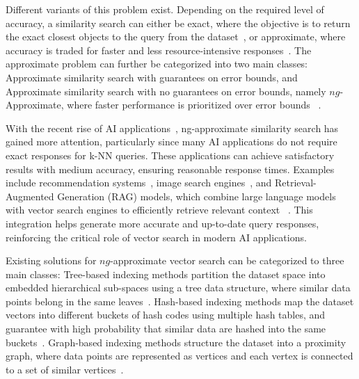 Different variants of this problem exist. Depending on the required level of accuracy, a similarity search can either be exact, where the objective is to return the exact closest objects to the query from the dataset~\cite{hercules,hydra1,conf/icde/echihabi2021,messi,parisplus,dumpy,dpisax,kdtree,dstree,isax2+,ulisse,vafile,twinsubsequences,oddysey,dstree}, or approximate, where accuracy is traded for faster and less resource-intensive responses~\cite{hydra2,hercules,qalsh,kdtree,kgraph,efanna,hnsw,dpg,conf/icassp/jegou2011,journal/iccv/xia2013,journal/pami/babenko15,hnsw,hcnng,nsg,vamana}. The approximate problem can further be categorized into two main classes: Approximate similarity search with guarantees on error bounds\cite{conf/vldb/lv2007,sk-lsh,journal/pvldb/zheng2020,journal/pvldb/zhu2016,conf/stoc/indyk1998,conf/vldb/sun14,qalsh,hydra2,srs,conf/sigmod/gogolou20}, and Approximate similarity search with no guarantees on error bounds, namely $ng$-Approximate, where faster performance is prioritized over error bounds ~\cite{kdtree,hydra2,elpis,hercules,hnsw,nsg,hcnng,efanna,nsg,nssg,nsw11,vamana,ieh,dpg,kgraph}.

With the recent rise of AI applications~\cite{rag0, nsg,alibabaknngml, recommender_systems,faiss,amazon}, ng-approximate similarity search has gained more attention, particularly since many AI applications do not require exact responses for k-NN queries. These applications can achieve satisfactory results with medium accuracy, ensuring reasonable response times. Examples include recommendation systems~\cite{conf/kdd/wang2018,amazon,nsg}, image search engines~\cite{nsg,faiss}, and Retrieval-Augmented Generation (RAG) models\cite{retrieval-diffusion-models,dense-passage-retrieval,seq2seq,rag-nlp}, which combine large language models with vector search engines to efficiently retrieve relevant context ~\cite{retrieval-diffusion-models,rag-nlp,rag0,rag1,rag2,rag3}. This integration helps generate more accurate and up-to-date query responses, reinforcing the critical role of vector search in modern AI applications.

Existing solutions for $ng$-approximate vector search can be categorized to three main classes: Tree-based indexing methods partition the dataset space into embedded hierarchical sub-spaces using a tree data structure, where similar data points belong in the same leaves~\cite{va+file,dstree,isaxfamily,hercules,oddysey,isax2+,isax2plus}.
Hash-based indexing methods map the dataset vectors into different buckets of hash codes using multiple hash tables, and guarantee with high probability that similar data are hashed into the same buckets~\cite{lsh-survey,qalsh,aumuller2017ann,flann,sk-lsh}. 
Graph-based indexing methods structure the dataset into a proximity graph, where data points are represented as vertices and each vertex is connected to a set of similar vertices~\cite{kgraph,ieh,efanna,nsw11,nsw14,hnsw,nsg,nssg,vamana,SPTAG1,SPTAG3,elpis,dpg,graph-survey-vldb,lshapg}.

